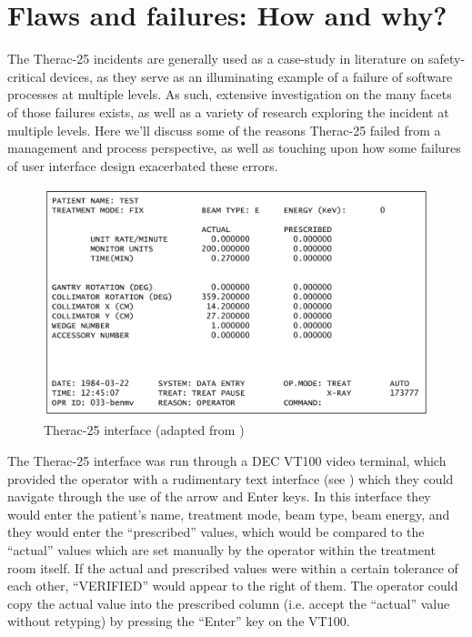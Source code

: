 \documentclass{cshonours}
\newcommand{\ther}{Therac-25\xspace}
\begin{document}
\chapter{Flaws and failures: How and why?}
\label{chap:flawsfailures}
The \ther incidents are generally used as a case-study in literature on safety-critical devices, as they serve as an illuminating example of a failure of software processes at multiple levels. As such, extensive investigation on the many facets of those failures exists, as well as a variety of research exploring the incident at multiple levels. Here we'll discuss some of the reasons \ther failed from a management and process perspective, as well as touching upon how some failures of user interface design exacerbated these errors.

\begin{figure}
 \centering
 \includegraphics[width=\textwidth]{figs/interface.pdf}
 \caption{\ther interface (adapted from \cite{theracassignment})}
 \label{fig:theracui}
\end{figure}

The \ther interface was run through a DEC VT100 video terminal, which provided the operator with a rudimentary text interface (see ) which they could navigate through the use of the arrow and Enter keys. In this interface they would enter the patient's name, treatment mode, beam type, beam energy, and they would enter the ``prescribed'' values, which would be compared to the ``actual'' values which are set manually by the operator within the treatment room itself. If the actual and prescribed values were within a certain tolerance of each other, ``VERIFIED'' would appear to the right of them. The operator could copy the actual value into the prescribed column (i.e. accept the ``actual'' value without retyping) by pressing the ``Enter'' key on the VT100.
\end{document}
